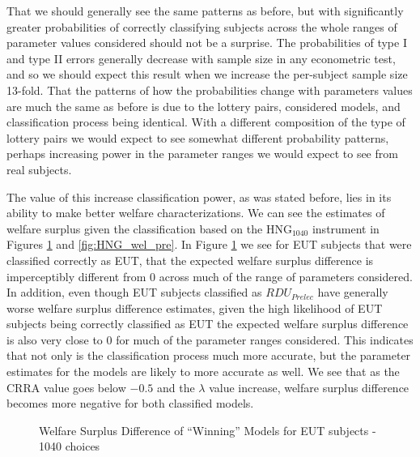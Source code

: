 \documentclass[../main.tex]{subfiles}
\begin{document}
That we should generally see the same patterns as before, but with significantly greater probabilities of correctly classifying subjects across the whole ranges of parameter values considered should not be a surprise.
The probabilities of type I and type II errors generally decrease with sample size in any econometric test, and so we should expect this result when we increase the per-subject sample size 13-fold.
That the patterns of how the probabilities change with parameters values are much the same as before is due to the lottery pairs, considered models, and classification process being identical.
With a different composition of the type of lottery pairs we would expect to see somewhat different probability patterns, perhaps increasing power in the parameter ranges we would expect to see from real subjects.

The value of this increase classification power, as was stated before, lies in its ability to make better welfare characterizations.
We can see the estimates of welfare surplus given the classification based on the $\text{HNG}_{1040}$ instrument in Figures \ref{fig:HNG_wel_eut} and \ref{fig:HNG_wel_pre}.
In Figure \ref{fig:HNG_wel_eut} we see for EUT subjects that were classified correctly as EUT, that the expected welfare surplus difference is imperceptibly different from 0 across much of the range of parameters considered.
In addition, even though EUT subjects classified as $\mathit{RDU_{Prelec}}$ have generally worse welfare surplus difference estimates, given the high likelihood of EUT subjects being correctly classified as EUT the expected welfare surplus difference is also very close to 0 for much of the parameter ranges considered.
This indicates that not only is the classification process much more accurate, but the parameter estimates for the models are likely to more accurate as well.
We see that as the CRRA value goes below $-0.5$ and the $\lambda$ value increase, welfare surplus difference becomes more negative for both classified models.

\begin{figure}[htp!]
	\center
	\caption{Welfare Surplus Difference of \enquote{Winning} Models for EUT subjects - 1040 choices}
	\label{fig:HNG_wel_eut}
\end{figure}
\end{document}
